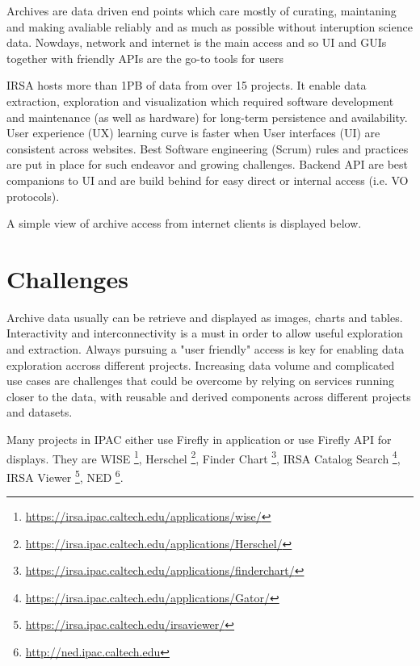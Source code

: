\documentclass[11pt,twoside]{article}
\begin{document}
Archives are data driven end points which care mostly of curating, maintaning and making avaliable reliably and as much as possible without interuption science data.
Nowdays, network and internet is the main access and so UI and GUIs together with friendly APIs are the go-to tools for users

IRSA hosts more than 1PB of data from over 15 projects. It enable data extraction, exploration and visualization which required software development and maintenance (as well as hardware) for long-term persistence and availability.
User experience (UX) learning curve is faster when User interfaces (UI) are consistent across websites.
Best Software engineering (Scrum) rules and practices are put in place for such endeavor and growing challenges.
Backend API are best companions to UI and are build behind for easy direct or internal access (i.e. VO protocols).

A simple view of archive access from internet clients is displayed below.




\section{Challenges}

Archive data usually can be retrieve and displayed as images, charts and tables.
Interactivity and interconnectivity is a must in order to allow useful exploration and extraction.
Always pursuing a "user friendly" access is key for enabling data exploration accross different projects.
Increasing data volume and complicated use cases are challenges that could be overcome by relying on services running closer to the data, with
reusable and derived components across different projects and datasets.

Many projects in IPAC either  use Firefly  in application or use Firefly API for displays.
They are WISE \footnote{\url{https://irsa.ipac.caltech.edu/applications/wise/}},
Herschel \footnote{\url{https://irsa.ipac.caltech.edu/applications/Herschel/}},
Finder Chart \footnote{\url{https://irsa.ipac.caltech.edu/applications/finderchart/}},
IRSA Catalog Search \footnote{\url{https://irsa.ipac.caltech.edu/applications/Gator/}},
IRSA Viewer \footnote{\url{https://irsa.ipac.caltech.edu/irsaviewer/}},
NED \footnote{\url{http://ned.ipac.caltech.edu}}.
\end{document}

